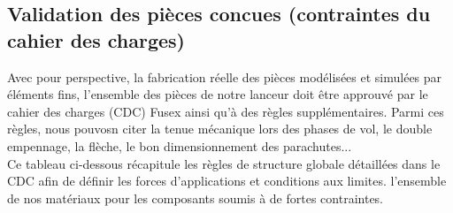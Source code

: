 \subsection{Validation des pièces concues (contraintes du cahier des charges)}
Avec pour perspective, la fabrication réelle des pièces modélisées et simulées par 
éléments fins, l'ensemble des pièces de notre lanceur doit être approuvé par le cahier 
des charges (CDC) \gls{Fusex} ainsi qu'à des règles supplémentaires. Parmi ces
 règles, nous pouvosn citer la tenue mécanique lors des phases de vol, le double empennage, 
la flèche, le bon dimensionnement des parachutes... \\
Ce tableau ci-dessous récapitule les règles de structure globale détaillées dans le 
\acrshort{CDC} afin de définir les forces d'applications et conditions aux limites.
l'ensemble de nos matériaux pour les composants soumis à de fortes contraintes.

